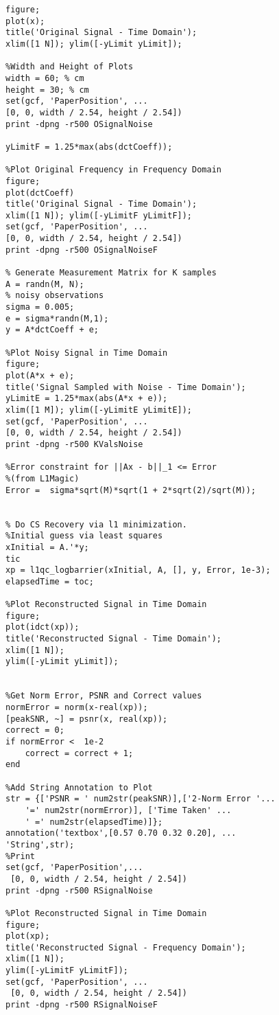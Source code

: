 \documentclass[titlepage,oneside, 12pt]{book}
\theoremstyle{break}
\begin{document}
\begin{appendices}
\begin{lstlisting}[label={lst:ex1DNoise}]
%Plot Original Signal in Time Domain
figure; 
plot(x); 
title('Original Signal - Time Domain'); 
xlim([1 N]); ylim([-yLimit yLimit]);

%Width and Height of Plots
width = 60; % cm 
height = 30; % cm
set(gcf, 'PaperPosition', ...
[0, 0, width / 2.54, height / 2.54])
print -dpng -r500 OSignalNoise

yLimitF = 1.25*max(abs(dctCoeff)); 

%Plot Original Frequency in Frequency Domain
figure;
plot(dctCoeff) 
title('Original Signal - Time Domain');
xlim([1 N]); ylim([-yLimitF yLimitF]);
set(gcf, 'PaperPosition', ...
[0, 0, width / 2.54, height / 2.54])
print -dpng -r500 OSignalNoiseF

% Generate Measurement Matrix for K samples
A = randn(M, N);
% noisy observations
sigma = 0.005;
e = sigma*randn(M,1);
y = A*dctCoeff + e;

%Plot Noisy Signal in Time Domain
figure; 
plot(A*x + e); 
title('Signal Sampled with Noise - Time Domain');
yLimitE = 1.25*max(abs(A*x + e)); 
xlim([1 M]); ylim([-yLimitE yLimitE]);
set(gcf, 'PaperPosition', ...
[0, 0, width / 2.54, height / 2.54])
print -dpng -r500 KValsNoise

%Error constraint for ||Ax - b||_1 <= Error 
%(from L1Magic)
Error =  sigma*sqrt(M)*sqrt(1 + 2*sqrt(2)/sqrt(M));


% Do CS Recovery via l1 minimization.
%Initial guess via least squares 
xInitial = A.'*y; 
tic
xp = l1qc_logbarrier(xInitial, A, [], y, Error, 1e-3);
elapsedTime = toc;

%Plot Reconstructed Signal in Time Domain
figure; 
plot(idct(xp)); 
title('Reconstructed Signal - Time Domain'); 
xlim([1 N]); 
ylim([-yLimit yLimit]);


%Get Norm Error, PSNR and Correct values
normError = norm(x-real(xp)); 
[peakSNR, ~] = psnr(x, real(xp));
correct = 0;
if normError <  1e-2
    correct = correct + 1;
end

%Add String Annotation to Plot
str = {['PSNR = ' num2str(peakSNR)],['2-Norm Error '...
    '=' num2str(normError)], ['Time Taken' ...
    ' =' num2str(elapsedTime)]}; 
annotation('textbox',[0.57 0.70 0.32 0.20], ...
'String',str);
%Print
set(gcf, 'PaperPosition',...
 [0, 0, width / 2.54, height / 2.54])
print -dpng -r500 RSignalNoise

%Plot Reconstructed Signal in Time Domain
figure; 
plot(xp); 
title('Reconstructed Signal - Frequency Domain'); 
xlim([1 N]); 
ylim([-yLimitF yLimitF]);
set(gcf, 'PaperPosition', ...
 [0, 0, width / 2.54, height / 2.54])
print -dpng -r500 RSignalNoiseF
\end{lstlisting}


\end{appendices}
\end{document}
